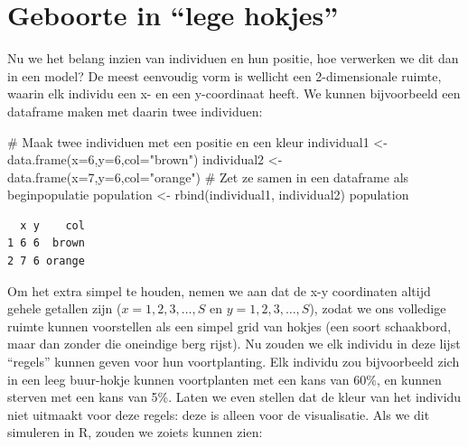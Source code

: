 \documentclass[
  a4paper,
]{scrbook}
\newenvironment{Shaded}{\begin{snugshade}}{\end{snugshade}}
\newcommand{\AttributeTok}[1]{\textcolor[rgb]{0.40,0.45,0.13}{#1}}
\newcommand{\CommentTok}[1]{\textcolor[rgb]{0.37,0.37,0.37}{#1}}
\newcommand{\DecValTok}[1]{\textcolor[rgb]{0.68,0.00,0.00}{#1}}
\newcommand{\FunctionTok}[1]{\textcolor[rgb]{0.28,0.35,0.67}{#1}}
\newcommand{\NormalTok}[1]{\textcolor[rgb]{0.00,0.23,0.31}{#1}}
\newcommand{\OtherTok}[1]{\textcolor[rgb]{0.00,0.23,0.31}{#1}}
\newcommand{\StringTok}[1]{\textcolor[rgb]{0.13,0.47,0.30}{#1}}
\theoremstyle{definition}
\theoremstyle{remark}
\begin{document}
\section{Geboorte in ``lege hokjes''}\label{geboorte-in-lege-hokjes}

Nu we het belang inzien van individuen en hun positie, hoe verwerken we
dit dan in een model? De meest eenvoudig vorm is wellicht een
2-dimensionale ruimte, waarin elk individu een x- en een y-coordinaat
heeft. We kunnen bijvoorbeeld een dataframe maken met daarin twee
individuen:

\begin{Shaded}
\begin{Highlighting}[]
\CommentTok{\# Maak twee individuen met een positie en een kleur}
\NormalTok{individual1 }\OtherTok{\textless{}{-}} \FunctionTok{data.frame}\NormalTok{(}\AttributeTok{x=}\DecValTok{6}\NormalTok{,}\AttributeTok{y=}\DecValTok{6}\NormalTok{,}\AttributeTok{col=}\StringTok{"brown"}\NormalTok{)}
\NormalTok{individual2 }\OtherTok{\textless{}{-}} \FunctionTok{data.frame}\NormalTok{(}\AttributeTok{x=}\DecValTok{7}\NormalTok{,}\AttributeTok{y=}\DecValTok{6}\NormalTok{,}\AttributeTok{col=}\StringTok{"orange"}\NormalTok{)}
\CommentTok{\# Zet ze samen in een dataframe als \textquotesingle{}beginpopulatie\textquotesingle{}}
\NormalTok{population }\OtherTok{\textless{}{-}} \FunctionTok{rbind}\NormalTok{(individual1, individual2)}
\NormalTok{population}
\end{Highlighting}
\end{Shaded}

\begin{verbatim}
  x y    col
1 6 6  brown
2 7 6 orange
\end{verbatim}

Om het extra simpel te houden, nemen we aan dat de x-y coordinaten
altijd gehele getallen zijn (\(x=1,2,3,\dots,S\) en
\(y=1,2,3,\dots,S\)), zodat we ons volledige ruimte kunnen voorstellen
als een simpel grid van hokjes (een soort schaakbord, maar dan zonder
die oneindige berg rijst). Nu zouden we elk individu in deze lijst
``regels'' kunnen geven voor hun voortplanting. Elk individu zou
bijvoorbeeld zich in een leeg buur-hokje kunnen voortplanten met een
kans van 60\%, en kunnen sterven met een kans van 5\%. Laten we even
stellen dat de kleur van het individu niet uitmaakt voor deze regels:
deze is alleen voor de visualisatie. Als we dit simuleren in R, zouden
we zoiets kunnen zien:
\end{document}
